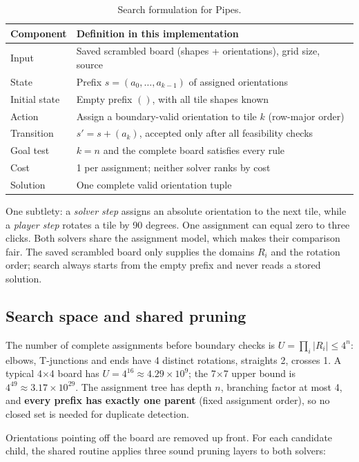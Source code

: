 \begin{table}[h]
\centering\small
\begin{tabular}{@{}p{}p{}@{}}
\toprule
Component & Definition in this implementation\\
\midrule
Input & Saved scrambled board (shapes + orientations), grid size, source\\
State & Prefix $s=(a_0,\dots,a_{k-1})$ of assigned orientations\\
Initial state & Empty prefix $()$, with all tile shapes known\\
Action & Assign a boundary-valid orientation to tile $k$ (row-major order)\\
Transition & $s' = s + (a_k)$, accepted only after all feasibility checks\\
Goal test & $k=n$ and the complete board satisfies every rule\\
Cost & 1 per assignment; neither solver ranks by cost\\
Solution & One complete valid orientation tuple\\
\bottomrule
\end{tabular}
\caption{Search formulation for Pipes.}
\end{table}

One subtlety: a \emph{solver step} assigns an absolute orientation to the next
tile, while a \emph{player step} rotates a tile by 90 degrees. One assignment can
equal zero to three clicks. Both solvers share the assignment model, which makes
their comparison fair. The saved scrambled board only supplies the domains $R_i$
and the rotation order; search always starts from the empty prefix and never
reads a stored solution.

\subsection{Search space and shared pruning}

The number of complete assignments before boundary checks is
$U=\prod_i |R_i| \le 4^n$: elbows, T-junctions and ends have 4 distinct rotations,
straights 2, crosses 1. A typical 4$\times$4 board has
$U = 4^{16} \approx 4.29\times10^9$; the 7$\times$7 upper bound is
$4^{49} \approx 3.17\times10^{29}$. The assignment tree has depth $n$, branching
factor at most 4, and \textbf{every prefix has exactly one parent} (fixed
assignment order), so no closed set is needed for duplicate detection.

Orientations pointing off the board are removed up front. For each candidate
child, the shared  routine applies three sound pruning layers
to both solvers:

